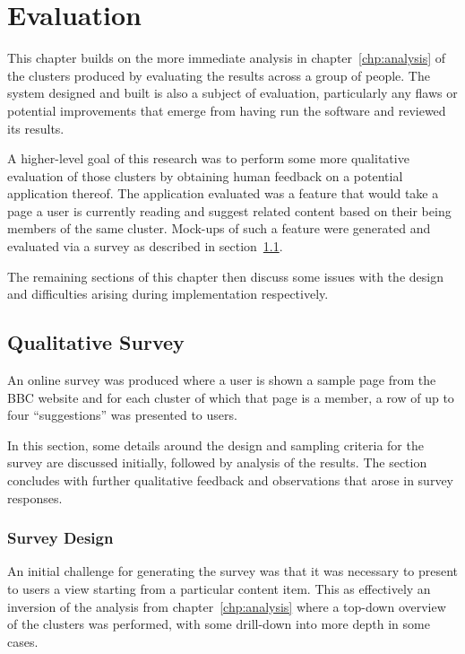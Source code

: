 \chapter{Evaluation}
\label{chp:evaluation}

This chapter builds on the more immediate analysis in
chapter~\ref{chp:analysis} of the clusters produced by evaluating the
results across a group of people. The system designed and built is
also a subject of evaluation, particularly any flaws or potential
improvements that emerge from having run the software and reviewed its
results.

A higher-level
goal of this research was to perform some more qualitative evaluation
of those clusters by obtaining human feedback on a potential
application thereof. The application evaluated was a feature that would
take a page a user is currently reading and suggest related content
based on their being members of the same cluster. Mock-ups of such
a feature were generated and evaluated via a survey as described
in section~\ref{sec:survey}.

The remaining sections of this chapter then discuss some issues with
the design and difficulties arising during implementation
respectively.

\section{Qualitative Survey}
\label{sec:survey}

An online survey was produced where a user is shown a sample page
from the BBC website and for each cluster of which that page is
a member, a row of up to four ``suggestions'' was presented to users.

In this section, some details around the design and sampling criteria
for the survey are discussed initially, followed by analysis of the
results. The section concludes with further qualitative feedback and
observations that arose in survey responses.

\subsection{Survey Design}

An initial challenge for generating the survey was that it was
necessary to present to users a view starting from a particular
content item. This as effectively an inversion of the analysis
from chapter~\ref{chp:analysis} where a top-down overview of the
clusters was performed, with some drill-down into more depth in some
cases.

